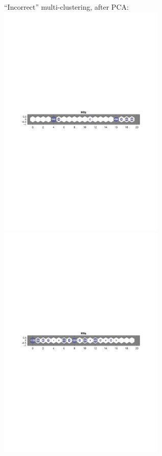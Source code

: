 \documentclass[10pt, oneside]{article}
\begin{document}
\begin{figure}[h]
\begin{center}
``Incorrect'' multi-clustering, after PCA:\\
\includegraphics[width=8cm]{pca-fail1-ones.pdf} \includegraphics[width=8cm]{pca-fail1-zeros.pdf}

\end{center}
\end{figure}
\end{document}
